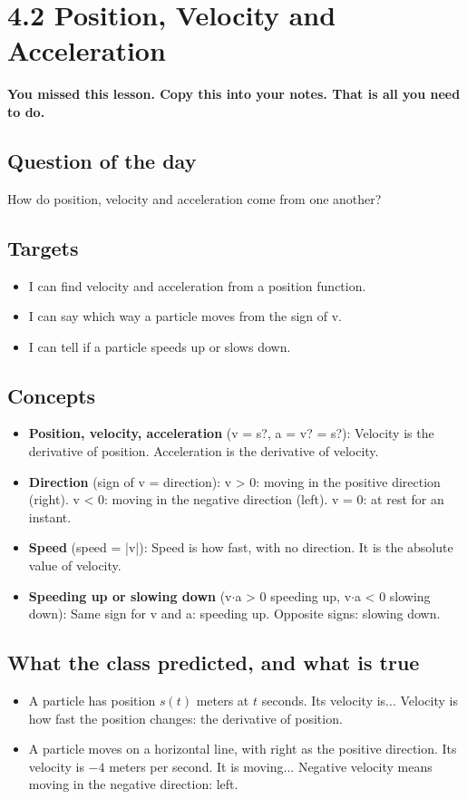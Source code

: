 \documentclass[11pt]{article}
\begin{document}
\section*{4.2 Position, Velocity and Acceleration}
\textbf{You missed this lesson. Copy this into your notes. That is all you need to do.}\par\medskip
\subsection*{Question of the day}
How do position, velocity and acceleration come from one another?\par
\subsection*{Targets}\begin{itemize}\item I can find velocity and acceleration from a position function.
\item I can say which way a particle moves from the sign of v.
\item I can tell if a particle speeds up or slows down.\end{itemize}
\subsection*{Concepts}\begin{itemize}
\item \textbf{Position, velocity, acceleration} (v = s?,  a = v? = s?): Velocity is the derivative of position. Acceleration is the derivative of velocity.
\item \textbf{Direction} (sign of v = direction): v > 0: moving in the positive direction (right). v < 0: moving in the negative direction (left). v = 0: at rest for an instant.
\item \textbf{Speed} (speed = |v|): Speed is how fast, with no direction. It is the absolute value of velocity.
\item \textbf{Speeding up or slowing down} (v$\cdot$a > 0 speeding up,  v$\cdot$a < 0 slowing down): Same sign for v and a: speeding up. Opposite signs: slowing down.
\end{itemize}
\subsection*{What the class predicted, and what is true}\begin{itemize}
\item A particle has position $s(t)$ meters at $t$ seconds. Its velocity is...  Velocity is how fast the position changes: the derivative of position.
\item A particle moves on a horizontal line, with right as the positive direction. Its velocity is $-4$ meters per second. It is moving...  Negative velocity means moving in the negative direction: left.
\end{itemize}
\end{document}
